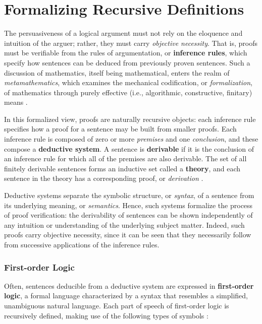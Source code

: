 \section{Formalizing Recursive Definitions}
\label{sec-fol}
The persuasiveness of a logical argument must not rely on the eloquence and intuition of the arguer; rather, they must carry \textit{objective necessity}. That is, proofs must be verifiable from the rules of argumentation, or \textbf{inference rules}, which specify how sentences can be deduced from previously proven sentences. Such a discussion of mathematics, itself being mathematical, enters the realm of \textit{metamathematics}, which examines the mechanical codification, or \textit{formalization}, of mathematics through purely effective (i.e., algorithmic, constructive, finitary) means \cite{Kleene1971}.

In this formalized view, proofs are naturally recursive objects: each inference rule specifies how a proof for a sentence may be built from smaller proofs. Each inference rule is composed of zero or more \textit{premises} and one \textit{conclusion}, and these compose a \textbf{deductive system}. A sentence is \textbf{derivable} if it is the conclusion of an inference rule for which all of the premises are also derivable. The set of all finitely derivable sentences forms an inductive set called a \textbf{theory}, and each sentence in the theory has a corresponding proof, or \textit{derivation} \cite{Chiswell2002}.

Deductive systems separate the symbolic structure, or \textit{syntax}, of a sentence from its underlying meaning, or \textit{semantics}. Hence, such systems formalize the process of proof verification: the derivability of sentences can be shown independently of any intuition or understanding of the underlying subject matter. Indeed, such proofs carry objective necessity, since it can be seen that they necessarily follow from successive applications of the inference rules.

\subsubsection{First-order Logic}
Often, sentences deducible from a deductive system are expressed in \textbf{first-order logic}, a formal language characterized by a syntax that resembles a simplified, unambiguous natural language. Each part of speech of first-order logic is recursively defined, making use of the following types of symbols \cite{Leary1999}:


